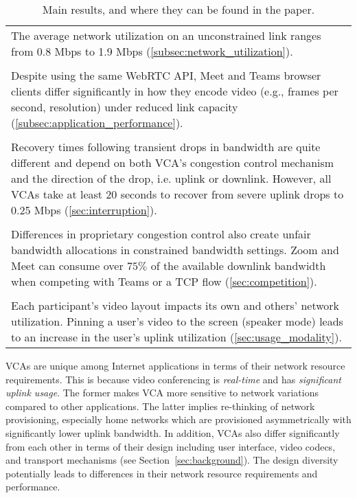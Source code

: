\begin{table}[t]
    \begin{small}
    \begin{tabular}{|p{3.25in}|}
 \hline 
    The average network utilization on an unconstrained link ranges from 0.8
        Mbps to 1.9 Mbps (\cref{subsec:network_utilization}).\\ \\
    Despite using the same WebRTC API, Meet and Teams browser clients differ significantly in how they encode video (e.g., frames per second, resolution) under reduced link capacity (\cref{subsec:application_performance}).
\\ \\
    Recovery times following transient drops in bandwidth are quite different
        and depend on both VCA's congestion control mechanism and the
        direction of the drop, i.e. uplink or downlink. However, all VCAs take
        at least 20 seconds to recover from severe uplink drops to 0.25 Mbps
        (\cref{sec:interruption}).\\\\
    Differences in proprietary congestion control also create unfair bandwidth
        allocations in constrained bandwidth settings. Zoom and Meet can
        consume over $75\%$ of the available downlink bandwidth when competing
        with Teams or a TCP flow (\cref{sec:competition}).\\\\
    Each participant's video layout impacts its own and others' network utilization. Pinning a user's video to the screen (speaker mode) leads to an increase in the user's uplink utilization (\cref{sec:usage_modality}). 
    \\ \hline
\end{tabular}
    \end{small}
    \caption{Main results, and where they can be found in the paper.\label{tab:results}}
\end{table}
VCAs are unique among Internet applications in terms of their network resource
requirements. This is because video conferencing is \textit{real-time} and has
\textit{significant uplink usage}. The former makes VCA more sensitive to
network variations compared to other applications. The latter implies
re-thinking of network provisioning, especially home networks which are
provisioned asymmetrically with significantly lower uplink bandwidth. In
addition, VCAs also differ significantly from each other in terms of their
design including user interface, video codecs, and transport mechanisms (see
Section~\ref{sec:background}). The design diversity potentially leads to
differences in their network resource requirements and performance.     
\fi
